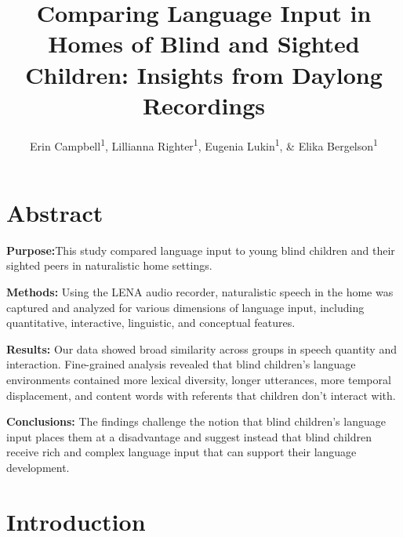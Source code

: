 \documentclass[
  man,floatsintext]{apa6}
\title{Comparing Language Input in Homes of Blind and Sighted Children: Insights from Daylong Recordings}
\author{Erin Campbell\textsuperscript{1}, Lillianna Righter\textsuperscript{1}, Eugenia Lukin\textsuperscript{1}, \& Elika Bergelson\textsuperscript{1}}
\date{}
\affiliation{\vspace{0.5cm}\textsuperscript{1} Department of Psychology \& Neuroscience, Duke University, Durham, NC}
\begin{document}
\maketitle

\hypertarget{abstract}{%
\section{Abstract}\label{abstract}}

\textbf{Purpose:}This study compared language input to young blind children and their sighted peers in naturalistic home settings.

\textbf{Methods:} Using the LENA audio recorder, naturalistic speech in the home was captured and analyzed for various dimensions of language input, including quantitative, interactive, linguistic, and conceptual features.

\textbf{Results:} Our data showed broad similarity across groups in speech quantity and interaction. Fine-grained analysis revealed that blind children's language environments contained more lexical diversity, longer utterances, more temporal displacement, and content words with referents that children don't interact with.

\textbf{Conclusions:} The findings challenge the notion that blind children's language input places them at a disadvantage and suggest instead that blind children receive rich and complex language input that can support their language development.

\hypertarget{introduction}{%
\section{Introduction}\label{introduction}}
\end{document}
